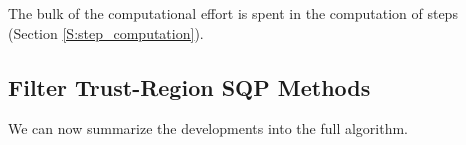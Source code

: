 The bulk of the computational effort is spent in the computation of steps (Section \ref{S:step_computation}).

\newpage


   


\newpage

\subsection{Filter Trust-Region SQP Methods}

We can now summarize the developments into the full algorithm.

